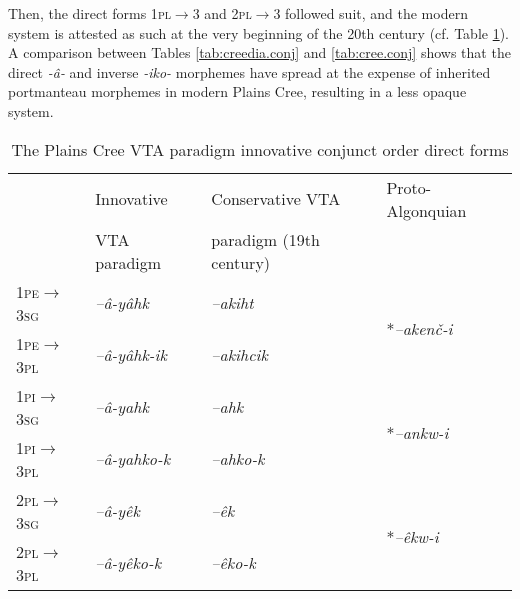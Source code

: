 \documentclass[twoside,a4paper,11pt]{article}
\newcommand{\ipa}[1]{{\phon\textit{#1}}}
\newcommand{\sg}{\textsc{sg}}
\newcommand{\pl}{\textsc{pl}}
\newcommand{\grise}[1]{\cellcolor{lightgray}\textbf{#1}}
\newcommand{\Σ}{\greek{Σ}}
\newcommand{\pli}{\textsc{pi}}
\newcommand{\pe}{\textsc{pe}}
\begin{document}
Then, the direct forms 1\pl$\rightarrow$3 and 2\pl$\rightarrow$3 followed suit, and the modern system is attested as such at the very beginning of the 20th century (cf. Table \ref{tab:cree.vta.innov.dir}). A comparison between Tables \ref{tab:creedia.conj} and \ref{tab:cree.conj} shows that the direct \ipa{-â-} and inverse \ipa{-iko-} morphemes have spread at the expense of inherited portmanteau morphemes in modern Plains Cree, resulting in a less opaque system.

\begin{table}[H]
\caption{The Plains Cree VTA paradigm innovative conjunct order direct forms}
\centering \label{tab:cree.vta.innov.dir}
\begin{tabular}{llll}
\toprule
& Innovative & Conservative VTA & Proto-Algonquian \\
& VTA paradigm & paradigm (19th century) &\\
\midrule
1\pe$\rightarrow$3\sg & 	\ipa{--â-yâhk} \grise{}& 	\ipa{--akiht} & \multirow{2}{*}{*\ipa{--akenč-i}} \\
1\pe$\rightarrow$3\pl & 	\ipa{--â-yâhk-ik} \grise{}& 	\ipa{--akihcik} \grise{} & \multirow{-2}{*}{}\\
1\pli$\rightarrow$3\sg & 	\ipa{--â-yahk} \grise{}& 	\ipa{--ahk}  &\multirow{2}{*}{*\ipa{--ankw-i}} \\
1\pli$\rightarrow$3\pl & 	\ipa{--â-yahko-k} \grise{}& 	\ipa{--ahko-k} \grise{} & \multirow{-2}{*}{} \\
\midrule
2\pl$\rightarrow$3\sg & \ipa{--â-yêk} \grise{} & \ipa{--êk} &\multirow{2}{*}{*\ipa{--êkw-i}}\\
2\pl$\rightarrow$3\pl & \ipa{--â-yêko-k} \grise{} & \ipa{--êko-k}\grise{} & \multirow{-2}{*}{}\\
\bottomrule
\end{tabular}
\end{table}
\end{document}
